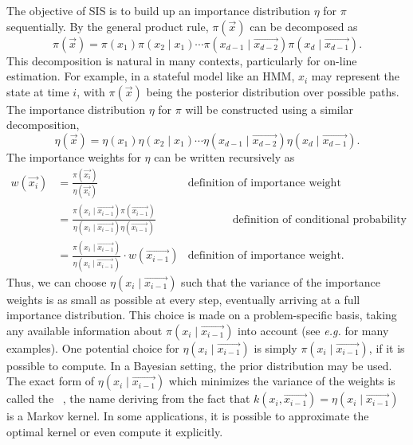 The objective of \gls{SIS} is to build up an importance distribution $\eta$ for
$\pi$ sequentially. By the general product rule, $\pi(\vec{x})$ can be
decomposed as
\[
  \pi(\vec{x}) 
  = \pi(x_1) \pi(x_2 \mid x_1) \cdots
    \pi(x_{d-1} \mid \vec{x_{d-2}}) \pi(x_d \mid \vec{x_{d-1}}).
\]
This decomposition is natural in many contexts, particularly for on-line
estimation. For example, in a stateful model like an \gls{HMM}, $x_i$ may
represent the state at time $i$, with $\pi(\vec{x})$ being the posterior
distribution over possible paths. The importance distribution $\eta$ for $\pi$
will be constructed using a similar decomposition,
\[
  \eta(\vec{x}) 
  = \eta(x_1) \eta(x_2 \mid x_1) \cdots
    \eta(x_{d-1} \mid \vec{x_{d-2}}) \eta(x_d \mid \vec{x_{d-1}}).
\]
The importance weights for $\eta$ can be written recursively as
\begin{equation}
  \label{eq:sisw}
  \begin{alignedat}{3}
  w(\vec{x_i}) 
    &= \frac{\pi(\vec{x_i})}{\eta(\vec{x_i})}
     & \text{definition of importance weight} \\
    &= \frac{\pi(x_i \mid \vec{x_{i-1}})\pi(\vec{x_{i-1}})}
         {\eta(x_i \mid \vec{x_{i-1}})\eta(\vec{x_{i-1}})}
      & \qquad\qquad\text{definition of conditional probability} \\
    &= \frac{\pi(x_i \mid \vec{x_{i-1}})}
            {\eta(x_i \mid \vec{x_{i-1}})}\cdot w(\vec{x_{i-1}})
      & \text{definition of importance weight}.
  \end{alignedat}
\end{equation}
Thus, we can choose $\eta(x_i \mid \vec{x_{i-1}})$ such that the variance of
the importance weights is as small as possible at every step, eventually
arriving at a full importance distribution. This choice is made on a
problem-specific basis, taking any available information about $\pi(x_i \mid
\vec{x_{i-1}})$ into account (see \textit{e.g.}
\autocite{smith2013sequential,liu2008monte} for many examples).  One potential
choice for $\eta(x_i \mid \vec{x_{i-1}})$ is simply $\pi(x_i \mid
\vec{x_{i-1}})$, if it is possible to compute. In a Bayesian setting, the
prior distribution may be used. The exact form of $\eta(x_i \mid
\vec{x_{i-1}})$ which minimizes the variance of the weights is called the
~\autocite{cappe2007overview}, the name deriving from the
fact that $k(x_i, \vec{x_{i-1}}) = \eta(x_i \mid \vec{x_{i-1}})$ is a Markov
kernel. In some applications, it is possible to approximate the optimal kernel
or even compute it explicitly.

